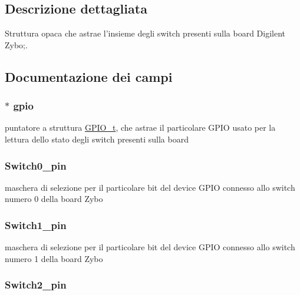 \subsection{Descrizione dettagliata}
Struttura opaca che astrae l'insieme degli switch presenti sulla board Digilent Zybo;. 

\subsection{Documentazione dei campi}
\hypertarget{struct_zybo_switch__t_acb3116190992a4d8d26545c103304d27}{
\subsubsection[{gpio}]{$\ast$ gpio}}\label{struct_zybo_switch__t_acb3116190992a4d8d26545c103304d27}
puntatore a struttura \hyperlink{struct_g_p_i_o__t}{G\+P\+I\+O\+\_\+t}, che astrae il particolare G\+P\+I\+O usato per la lettura dello stato degli switch presenti sulla board \hypertarget{struct_zybo_switch__t_a5b7f83cd96441b7d1692710c6499147c}{
\subsubsection[{Switch0\+\_\+pin}]{ Switch0\+\_\+pin}}\label{struct_zybo_switch__t_a5b7f83cd96441b7d1692710c6499147c}
maschera di selezione per il particolare bit del device G\+P\+I\+O connesso allo switch numero 0 della board Zybo \hypertarget{struct_zybo_switch__t_a6a3a5739e7e8f138241cafeeb7c1a33f}{
\subsubsection[{Switch1\+\_\+pin}]{ Switch1\+\_\+pin}}\label{struct_zybo_switch__t_a6a3a5739e7e8f138241cafeeb7c1a33f}
maschera di selezione per il particolare bit del device G\+P\+I\+O connesso allo switch numero 1 della board Zybo \hypertarget{struct_zybo_switch__t_a33eda4a0115ef585edd90078924ca56e}{
\subsubsection[{Switch2\+\_\+pin}]{ Switch2\+\_\+pin}}\label{struct_zybo_switch__t_a33eda4a0115ef585edd90078924ca56e}
